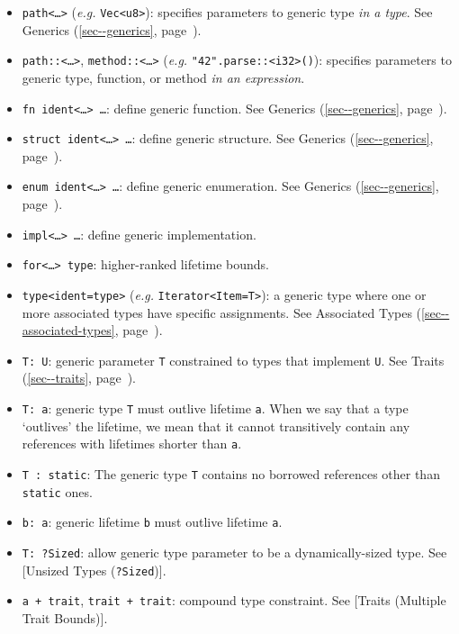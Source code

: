 \documentclass[a4paper,]{book}
\renewcommand*{\hyperref}[2][\ar]{%
  \def\ar{#2}%
  #2 (\autoref{#1}, page~\pageref{#1})}
\begin{document}
\begin{itemize}
\itemsep1pt\parskip0pt
\item
  \texttt{path\textless{}\ldots{}\textgreater{}} (\emph{e.g.}
  \texttt{Vec\textless{}u8\textgreater{}}): specifies parameters to
  generic type \emph{in a type}. See \hyperref[sec--generics]{Generics}.
\item
  \texttt{path::\textless{}\ldots{}\textgreater{}},
  \texttt{method::\textless{}\ldots{}\textgreater{}} (\emph{e.g.}
  \texttt{"42".parse::\textless{}i32\textgreater{}()}): specifies
  parameters to generic type, function, or method \emph{in an
  expression}.
\item
  \texttt{fn\ ident\textless{}\ldots{}\textgreater{}\ \ldots{}}: define
  generic function. See \hyperref[sec--generics]{Generics}.
\item
  \texttt{struct\ ident\textless{}\ldots{}\textgreater{}\ \ldots{}}:
  define generic structure. See \hyperref[sec--generics]{Generics}.
\item
  \texttt{enum\ ident\textless{}\ldots{}\textgreater{}\ \ldots{}}:
  define generic enumeration. See \hyperref[sec--generics]{Generics}.
\item
  \texttt{impl\textless{}\ldots{}\textgreater{}\ \ldots{}}: define
  generic implementation.
\item
  \texttt{for\textless{}\ldots{}\textgreater{}\ type}: higher-ranked
  lifetime bounds.
\item
  \texttt{type\textless{}ident=type\textgreater{}} (\emph{e.g.}
  \texttt{Iterator\textless{}Item=T\textgreater{}}): a generic type
  where one or more associated types have specific assignments. See
  \hyperref[sec--associated-types]{Associated Types}.
\end{itemize}

\begin{itemize}
\itemsep1pt\parskip0pt
\item
  \texttt{T:\ U}: generic parameter \texttt{T} constrained to types that
  implement \texttt{U}. See \hyperref[sec--traits]{Traits}.
\item
  \texttt{T:\ \textquotesingle{}a}: generic type \texttt{T} must outlive
  lifetime \texttt{\textquotesingle{}a}. When we say that a type
  `outlives' the lifetime, we mean that it cannot transitively contain
  any references with lifetimes shorter than
  \texttt{\textquotesingle{}a}.
\item
  \texttt{T\ :\ \textquotesingle{}static}: The generic type \texttt{T}
  contains no borrowed references other than
  \texttt{\textquotesingle{}static} ones.
\item
  \texttt{\textquotesingle{}b:\ \textquotesingle{}a}: generic lifetime
  \texttt{\textquotesingle{}b} must outlive lifetime
  \texttt{\textquotesingle{}a}.
\item
  \texttt{T:\ ?Sized}: allow generic type parameter to be a
  dynamically-sized type. See {[}Unsized Types (\texttt{?Sized}){]}.
\item
  \texttt{\textquotesingle{}a\ +\ trait}, \texttt{trait\ +\ trait}:
  compound type constraint. See {[}Traits (Multiple Trait Bounds){]}.
\end{itemize}
\end{document}
